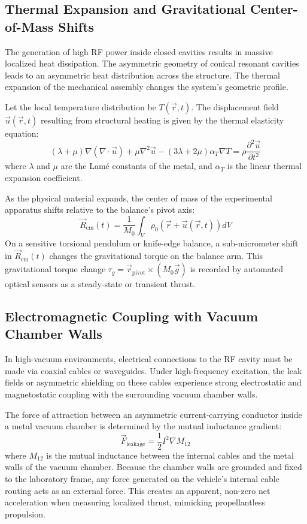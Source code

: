 \documentclass[journal,10pt,twoside]{IEEEtran}
\begin{document}
\subsection{Thermal Expansion and Gravitational Center-of-Mass Shifts}
The generation of high RF power inside closed cavities results in massive localized heat dissipation. The asymmetric geometry of conical resonant cavities leads to an asymmetric heat distribution across the structure. The thermal expansion of the mechanical assembly changes the system's geometric profile.

Let the local temperature distribution be $T(\vec{r}, t)$. The displacement field $\vec{u}(\vec{r}, t)$ resulting from structural heating is given by the thermal elasticity equation:
\begin{equation}
(\lambda + \mu) \nabla (\nabla \cdot \vec{u}) + \mu \nabla^2 \vec{u} - (3\lambda + 2\mu)\alpha_T \nabla T = \rho \frac{\partial^2 \vec{u}}{\partial t^2}
\label{eq:thermal_displacement}
\end{equation}
where $\lambda$ and $\mu$ are the Lam\'{e} constants of the metal, and $\alpha_T$ is the linear thermal expansion coefficient.

As the physical material expands, the center of mass of the experimental apparatus shifts relative to the balance's pivot axis:
\begin{equation}
\vec{R}_{\text{cm}}(t) = \frac{1}{M_0} \int_V \rho_0 \left( \vec{r} + \vec{u}(\vec{r}, t) \right) dV
\label{eq:cm_shift_integral}
\end{equation}
On a sensitive torsional pendulum or knife-edge balance, a sub-micrometer shift in $\vec{R}_{\text{cm}}(t)$ changes the gravitational torque on the balance arm. This gravitational torque change $\tau_g = \vec{r}_{\text{pivot}} \times (M_0 \vec{g})$ is recorded by automated optical sensors as a steady-state or transient thrust. 

\subsection{Electromagnetic Coupling with Vacuum Chamber Walls}
In high-vacuum environments, electrical connections to the RF cavity must be made via coaxial cables or waveguides. Under high-frequency excitation, the leak fields or asymmetric shielding on these cables experience strong electrostatic and magnetostatic coupling with the surrounding vacuum chamber walls.

The force of attraction between an asymmetric current-carrying conductor inside a metal vacuum chamber is determined by the mutual inductance gradient:
\begin{equation}
\vec{F}_{\text{leakage}} = \frac{1}{2} I^2 \nabla M_{12}
\label{eq:mutual_inductance_force}
\end{equation}
where $M_{12}$ is the mutual inductance between the internal cables and the metal walls of the vacuum chamber. Because the chamber walls are grounded and fixed to the laboratory frame, any force generated on the vehicle's internal cable routing acts as an external force. This creates an apparent, non-zero net acceleration when measuring localized thrust, mimicking propellantless propulsion.
\end{document}
